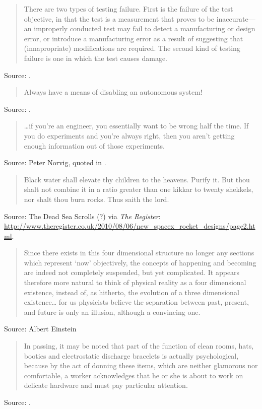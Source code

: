 \documentclass[a4paper]{article}
\begin{document}
\begin{quote}
	There are two types of testing failure.  First is the failure
	of the test objective, in that the test is a measurement that
	proves to be inaccurate---an improperly conducted test may fail
	to detect a manufacturing or design error, or introduce a
	manufacturing error as a result of suggesting that (innapropriate)
	modifications are required.  The second kind of testing failure
	is one in which the test causes damage.
\end{quote}
Source: \citet[p. 327]{Harland2005}.
\medskip

\begin{quote}
	Always have a means of disabling an autonomous system!
\end{quote}
Source: \citet[p.~326]{Harland2005}.
\medskip

\begin{quote}
	\ldots if you're an engineer, you essentially want to be wrong
	half the time.  If you do experiments and you're always right, then
	you aren't getting enough information out of those experiments.
\end{quote}
Source: Peter Norvig, quoted in \citet{Schulz2010}.
\medskip

\begin{quote}
	Black water shall elevate thy children to the heavens. Purify
	it.  But thou shalt not combine it in a ratio greater than one
	kikkar to twenty shekkels, nor shalt thou burn rocks.  Thus saith
	the lord.
\end{quote}
Source: The Dead Sea Scrolls (?) via \emph{The Register}:
\url{http://www.theregister.co.uk/2010/08/06/new_spacex_rocket_designs/page2.html}.
\medskip

\begin{quote}
	Since there exists in this four dimensional structure no longer
	any sections which represent `now' objectively, the concepts
	of happening and becoming are indeed not completely suspended,
	but yet complicated. It appears therefore more natural to think
	of physical reality as a four dimensional existence, instead of,
	as hitherto, the evolution of a three dimensional existence\ldots
	for us physicists believe the separation between past, present,
	and future is only an illusion, although a convincing one.
\end{quote}
Source: Albert Einstein
\medskip

\begin{quote}
	In passing, it may be noted that part of the function of clean
	rooms, hats, booties and electrostatic discharge bracelets is
	actually psychological, because by the act of donning these
	items, which are neither glamorous nor comfortable, a worker
	acknowledges that he or she is about to work on delicate
	hardware and must pay particular attention.
\end{quote}
Source: \citet[p.~280]{Harland2005}.
\medskip
\end{document}
